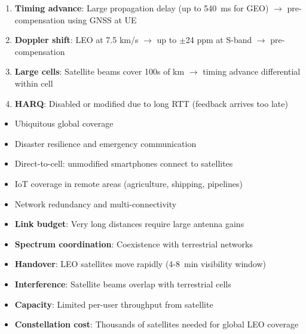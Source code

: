 
\begin{enumerate}
\def\labelenumi{\arabic{enumi}.}
\tightlist
\item
  \textbf{Timing advance}: Large propagation delay (up to 540~ms for GEO) \ensuremath{\to} pre-compensation using GNSS at UE
\item
  \textbf{Doppler shift}: LEO at 7.5 km/\allowbreak{}s \ensuremath{\to} up to \ensuremath{\pm}24 ppm at S-band \ensuremath{\to} pre-compensation
\item
  \textbf{Large cells}: Satellite beams cover 100s of km \ensuremath{\to} timing advance differential within cell
\item
  \textbf{HARQ}: Disabled or modified due to long RTT (feedback arrives too late)
\end{enumerate}





\begin{itemize}
\tightlist
\item
  Ubiquitous global coverage
\item
  Disaster resilience and emergency communication
\item
  Direct-to-cell: unmodified smartphones connect to satellites
\item
  IoT coverage in remote areas (agriculture, shipping, pipelines)
\item
  Network redundancy and multi-connectivity
\end{itemize}


\begin{itemize}
\tightlist
\item
  \textbf{Link budget}: Very long distances require large antenna gains
\item
  \textbf{Spectrum coordination}: Coexistence with terrestrial networks
\item
  \textbf{Handover}: LEO satellites move rapidly (4-8~min visibility window)
\item
  \textbf{Interference}: Satellite beams overlap with terrestrial cells
\item
  \textbf{Capacity}: Limited per-user throughput from satellite
\item
  \textbf{Constellation cost}: Thousands of satellites needed for global LEO coverage
\end{itemize}

